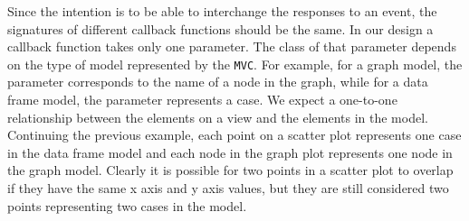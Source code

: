 \documentclass[11pt]{article}
\newcommand{\Robject}[1]{{\texttt{#1}}}
\newcommand{\Rslot}[1]{\textsl{#1}}
\newcommand{\Rclass}[1]{\texttt{#1}}
\begin{document}



Since the intention is to be able to interchange the responses to an event,
the signatures of different callback functions should be the same.
In our design a callback function takes only one parameter. 
The class of that parameter depends on the type of model represented by the
\Robject{MVC}.  For example, for a graph model, the parameter corresponds to
the name of a node in the graph, while for a data frame model, the parameter
represents a case.  We expect a one-to-one relationship between the elements
on a view and the elements in the model.  Continuing the previous example,
each point on a scatter plot represents one case in the data frame model and
each node in the graph plot represents one node in the graph model.  Clearly
it is possible for two points in a scatter plot to overlap if they have the
same x axis and y axis values, but they are still considered two points
representing two cases in the model.
\end{document}
